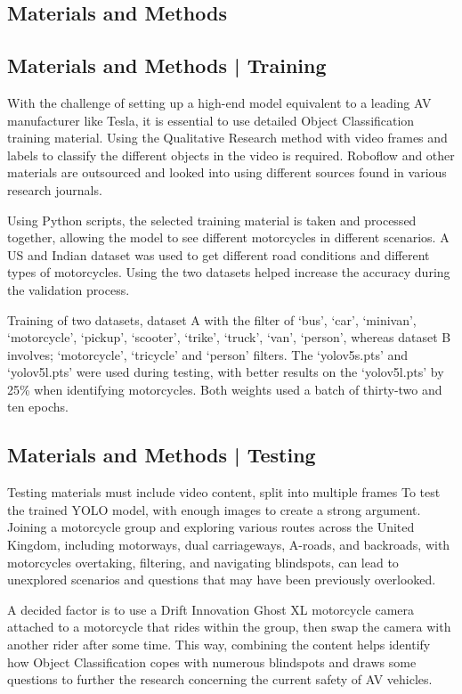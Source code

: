 \documentclass[a0,portrait]{a0poster}
\begin{document}
\begin{multicols}{2}
	\section*{Materials and Methods}
		\subsection*{Materials and Methods | Training}
			With the challenge of setting up a high-end model equivalent to a leading AV manufacturer like Tesla, it is essential to use detailed Object Classification training material. Using the Qualitative Research method with video frames and labels to classify the different objects in the video is required. Roboflow and other materials are outsourced and looked into using different sources found in various research journals.

			Using Python scripts, the selected training material is taken and processed together, allowing the model to see different motorcycles in different scenarios. A US and Indian dataset was used to get different road conditions and different types of motorcycles. Using the two datasets helped increase the accuracy during the validation process.

			Training of two datasets, dataset A with the filter of `bus', `car', `minivan', `motorcycle', `pickup', `scooter', `trike', `truck', `van', `person', whereas dataset B involves; `motorcycle', `tricycle' and `person' filters. The `yolov5s.pts' and `yolov5l.pts' were used during testing, with better results on the `yolov5l.pts' by 25\% when identifying motorcycles. Both weights used a batch of thirty-two and ten epochs.

		\subsection*{Materials and Methods | Testing}
			Testing materials must include video content, split into multiple frames To test the trained YOLO model, with enough images to create a strong argument. Joining a motorcycle group and exploring various routes across the United Kingdom, including motorways, dual carriageways, A-roads, and backroads, with motorcycles overtaking, filtering, and navigating blindspots, can lead to unexplored scenarios and questions that may have been previously overlooked.
					
			A decided factor is to use a Drift Innovation Ghost XL motorcycle camera attached to a motorcycle that rides within the group, then swap the camera with another rider after some time. This way, combining the content helps identify how Object Classification copes with numerous blindspots and draws some questions to further the research concerning the current safety of AV vehicles. 
			

\end{multicols}
\end{document}
